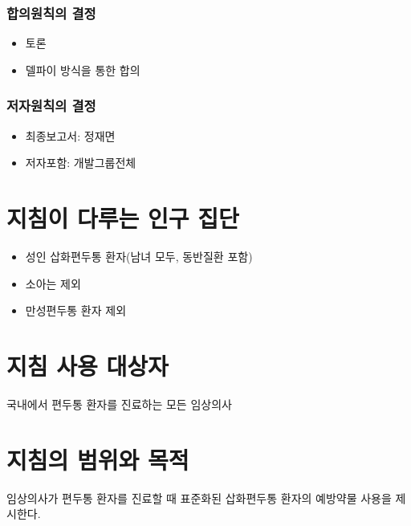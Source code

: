 \documentclass[]{book}
\providecommand{\tightlist}{%
  \setlength{\itemsep}{0pt}\setlength{\parskip}{0pt}}
\begin{document}
\hypertarget{section-36}{%
\subsubsection*{합의원칙의 결정}\label{section-36}}

\begin{itemize}
\tightlist
\item
  토론
\item
  델파이 방식을 통한 합의
\end{itemize}

\hypertarget{section-37}{%
\subsubsection*{저자원칙의 결정}\label{section-37}}

\begin{itemize}
\tightlist
\item
  최종보고서: 정재면
\item
  저자포함: 개발그룹전체
\end{itemize}

\hypertarget{section-38}{%
\section{지침이 다루는 인구 집단}\label{section-38}}

\begin{itemize}
\tightlist
\item
  성인 삽화편두통 환자(남녀 모두, 동반질환 포함)
\item
  소아는 제외
\item
  만성편두통 환자 제외
\end{itemize}

\hypertarget{section-39}{%
\section{지침 사용 대상자}\label{section-39}}

국내에서 편두통 환자를 진료하는 모든 임상의사

\hypertarget{section-40}{%
\section{지침의 범위와 목적}\label{section-40}}

임상의사가 편두통 환자를 진료할 때 표준화된 삽화편두통 환자의 예방약물 사용을 제시한다.
\end{document}

